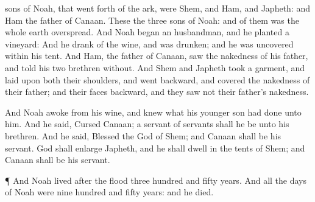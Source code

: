 {sons of
Noah, that went
forth of the
ark, were
Shem, and
Ham, and
Japheth: and
Ham
{} the
father of
Canaan.
These
{} the
three
sons of
Noah: and of them was the whole
earth
overspread.
And
Noah
began
{} an
husbandman, and he
planted a
vineyard:
And he
drank of the
wine, and was
drunken; and he was
uncovered
within his
tent.
And
Ham, the
father of
Canaan,
saw the
nakedness of his
father, and
told his
two
brethren
without.
And
Shem and
Japheth
took a
garment, and
laid
{} upon
both their
shoulders, and
went
backward, and
covered the
nakedness of their
father; and their
faces
{}
backward, and they
saw not their
father’s
nakedness.
\par }{\PP {}And
Noah
awoke from his
wine, and
knew what his
younger
son had
done unto him.
And he
said,
Cursed
{}
Canaan; a
servant of
servants shall he be unto his
brethren.
And he
said,
Blessed
{} the
{}
God of
Shem; and
Canaan shall
be his
servant.
God shall
enlarge
Japheth, and he shall
dwell in the
tents of
Shem; and
Canaan shall be his
servant.
\par }{\PP {}¶ And
Noah
lived
after the
flood
three
hundred and
fifty
years.
And all the
days of
Noah were
nine
hundred and
fifty
years: and he
died.

}
